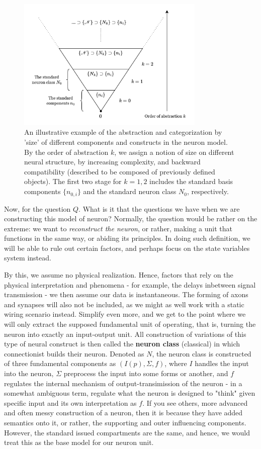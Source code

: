 \begin{figure}[h!]
    \centering
    \includegraphics[width=0.8\textwidth]{img/abstractionpps.png}
    \caption{An illustrative example of the abstraction and categorization by 'size' of different components and constructs in the neuron model. By the order of abstraction $k$, we assign a notion of size on different neural structure, by increasing complexity, and backward compatibility (described to be composed of previously defined objects). The first two stage for $k=1,2$ includes the standard basis components $\{n_{0,i}\}$ and the standard neuron class $N_{0}$, respectively.}
\end{figure}

Now, for the question $Q$. What is it that the questions we have when we are constructing this model of neuron? Normally, the question would be rather on the extreme: we want to \textit{reconstruct the neuron}, or rather, making a unit that functions in the same way, or abiding its principles. In doing such definition, we will be able to rule out certain factors, and perhaps focus on the state variables system instead. 

By this, we assume no physical realization. Hence, factors that rely on the physical interpretation and phenomena - for example, the delays inbetween signal transmission - we then assume our data is instantaneous. The forming of axons and synapses will also not be included, as we might as well work with a static wiring scenario instead. Simplify even more, and we get to the point where we will only extract the supposed fundamental unit of operating, that is, turning the neuron into exactly an input-output unit. All construction of variations of this type of neural construct is then called the \textbf{neuron class} (classical) in which connectionist builds their neuron. Denoted as $N$, the neuron class is constructed of three fundamental components as $(I(p), \Sigma, f)$, where $I$ handles the input into the neuron, $\Sigma$ preprocess the input into some forms or another, and $f$ regulates the internal mechanism of output-transimission of the neuron - in a somewhat ambiguous term, regulate what the neuron is designed to "think" given specific input and its own interpretation as $f$. If you see others, more advanced and often messy construction of a neuron, then it is because they have added semantics onto it, or rather, the supporting and outer influencing components. However, the standard issued compartments are the same, and hence, we would treat this as the base model for our neuron unit.

